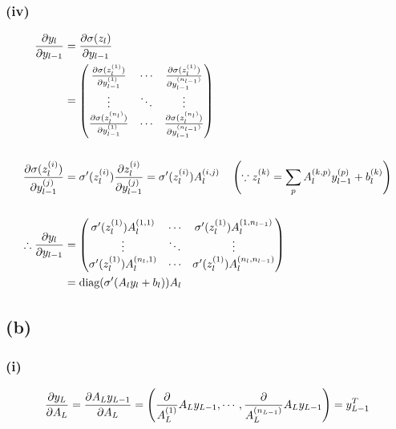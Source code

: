 \documentclass[10pt]{article}
\begin{document}
\subsubsection*{(iv)}
\begin{align*}
    {\partial y_l \over \partial y_{l-1}} &= {\partial \sigma(z_l) \over \partial y_{l-1}} \\
    &= \begin{pmatrix}
        {\partial \sigma(z_l^{(1)}) \over \partial y_{l-1}^{(1)}} & \cdots & {\partial \sigma(z_l^{(1)}) \over \partial y_{l-1}^{(n_{l-1})}}\\
        \vdots & \ddots & \vdots \\
        {\partial \sigma(z_l^{(n_l)}) \over \partial y_{l-1}^{(1)}} & \cdots & {\partial \sigma(z_l^{(n_l)}) \over \partial y_{l-1}^{(n_{l-1})}}
    \end{pmatrix}\\ \\
    {\partial \sigma(z_l^{(i)}) \over \partial y_{l-1}^{(j)}} &= \sigma^\prime(z_l^{(i)}) {\partial z_l^{(i)} \over \partial y_{l-1}^{(j)}}
    = \sigma^\prime(z_l^{(i)}) A_l^{(i,j)}\quad \left(\because z_l^{(k)} = \sum_p A_l^{(k,p)}y_{l-1}^{(p)} + b_l^{(k)}\right)\\ \\
    \therefore {\partial y_l \over \partial y_{l-1}} &= \begin{pmatrix}
        \sigma^\prime(z_l^{(1)})A_l^{(1,1)} & \cdots & \sigma^\prime(z_l^{(1)})A_l^{(1,n_{l-1})} \\
        \vdots & \ddots & \vdots \\
        \sigma^\prime(z_l^{(1)})A_l^{(n_l,1)} & \cdots & \sigma^\prime(z_l^{(1)})A_l^{(n_l,n_{l-1})}
    \end{pmatrix}\\
    &= \text{diag}(\sigma^{\prime}(A_ly_l + b_l))A_l
\end{align*}

\subsection*{(b)}
\subsubsection*{(i)}
\begin{equation*}
    {\partial y_L \over \partial A_L} = {\partial A_Ly_{L-1} \over \partial A_L} = \left({\partial \over A_L^{(1)}}A_Ly_{L-1}, \cdots, {\partial \over A_L^{(n_{L-1})}}A_Ly_{L-1}\right) = y_{L-1}^T
\end{equation*}
\end{document}
